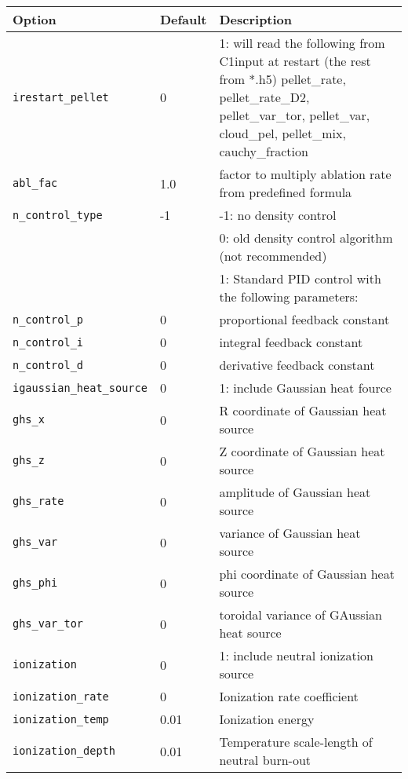 \begin{tabular}{llp{4.5in}}
  \textbf{Option}&\textbf{Default}&\textbf{Description}\\
  \hline

  \texttt{irestart\_pellet} & 0 & 1: will read the following from C1input at restart (the rest from *.h5)
                                     pellet\_rate, pellet\_rate\_D2, pellet\_var\_tor, 
                                     pellet\_var, cloud\_pel, pellet\_mix, cauchy\_fraction \\
  \texttt{abl\_fac} & 1.0 &  factor to multiply ablation rate from predefined formula \\ 

  \hline
  \texttt{n\_control\_type} & -1 & -1:  no density control \\
                            &    &  0:  old density control algorithm (not recommended) \\
                            &    &  1:  Standard PID control with the following parameters: \\
  \texttt{n\_control\_p}    & 0  &  proportional feedback constant \\
  \texttt{n\_control\_i}    & 0 &  integral feedback constant \\
  \texttt{n\_control\_d}    & 0 &  derivative feedback constant \\
  \hline
  \texttt{igaussian\_heat\_source} & 0 & 1: include Gaussian heat fource \\
  \texttt{ghs\_x}   & 0 & R coordinate of Gaussian heat source \\
  \texttt{ghs\_z}   & 0 & Z coordinate of Gaussian heat source \\
  \texttt{ghs\_rate}& 0 & amplitude of Gaussian heat source \\
  \texttt{ghs\_var} & 0 & variance of Gaussian heat source \\
  \texttt{ghs\_phi} & 0 & phi coordinate of Gaussian heat source \\
  \texttt{ghs\_var\_tor} & 0 & toroidal variance of GAussian heat source \\
  \hline

  \texttt{ionization}   & 0  & 1: include neutral ionization source \\
  \texttt{ionization\_rate} & 0 & Ionization rate coefficient\\
  \texttt{ionization\_temp} & 0.01 & Ionization energy\\
  \texttt{ionization\_depth}& 0.01 & Temperature scale-length of neutral burn-out
\end{tabular}


